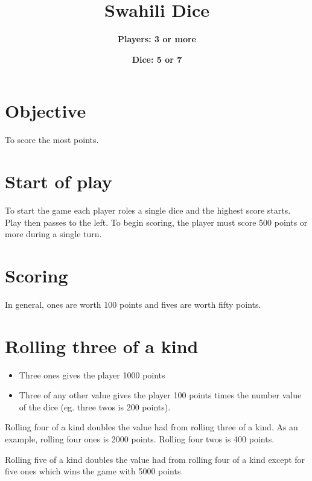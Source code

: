 \documentclass[twocolumn,12pt]{article}
\begin{document}
\parindent=0in

\title{Swahili Dice}
\author{\bf{Players:} 3 or more}
\date{\bf{Dice:} 5 or 7}
\maketitle

\thispagestyle{empty}


\section*{Objective}
To score the most points.

\section*{Start of play}
To start the game each player roles a single dice and the highest score
starts. Play then passes to the left.  To begin scoring, the player must score
500 points or more during a single turn.

\section*{Scoring}
In general, ones are worth 100 points and fives are worth fifty points.
\section*{Rolling three of a kind}
\begin{itemize}
\item Three ones gives the player 1000 points
\item Three of any other value gives the player 100 points times the number value of the dice (eg. three twos is 200 points).
\end{itemize}

Rolling four of a kind doubles the value had from rolling three of a kind.  As
an example, rolling four ones is 2000 points.  Rolling four twos is 400
points.

Rolling five of a kind doubles the value had from rolling four of a kind
except for five ones which wins the game with 5000 points.
\end{document}
